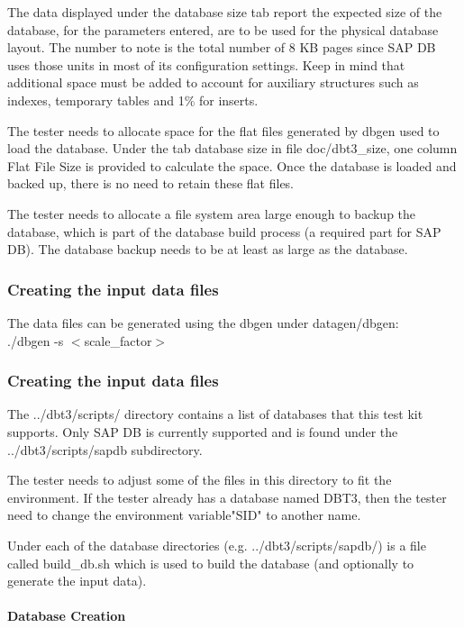 \documentclass{article}
\begin{document}
\noindent
The data displayed under the database size tab report the expected
size of the database, for the parameters entered, are to be used for
the physical database layout.  The number to note is the total number
of 8 KB pages since SAP DB uses those units in most of its
configuration settings.  Keep in mind that additional space must be
added to account for auxiliary structures such as indexes, temporary
tables and 1\% for inserts.

\noindent
The tester needs to allocate space for the flat files generated by
dbgen used to load the database.  Under the tab database size in file
doc/dbt3\_size, one column Flat File Size is provided to calculate the
space.  Once the database is loaded and backed up, there is no need
to retain these flat files.  

\noindent
The tester needs to allocate a file system area large enough to backup
the database, which is part of the database build process (a required
part for SAP DB).  The database backup needs to be at least as large
as the database.

\subsubsection{Creating the input data files}

\noindent
The data files can be generated using the dbgen under datagen/dbgen: \\
\indent ./dbgen -s $<$scale\_factor$>$

\subsubsection{Creating the input data files}

\noindent
The ../dbt3/scripts/ directory contains a list of databases that this
test kit supports.  Only SAP DB is currently supported and is found
under the ../dbt3/scripts/sapdb subdirectory.  

\noindent
The tester needs to adjust some of the files in this directory to fit
the environment.  If the tester already has a database named DBT3,
then the tester need to change the environment variable"SID" to
another name.

\noindent
Under each of the database directories (e.g.  ../dbt3/scripts/sapdb/)
is a file called build\_db.sh which is used to build the database (and
optionally to generate the input data).

\paragraph{Database Creation}
\end{document}
